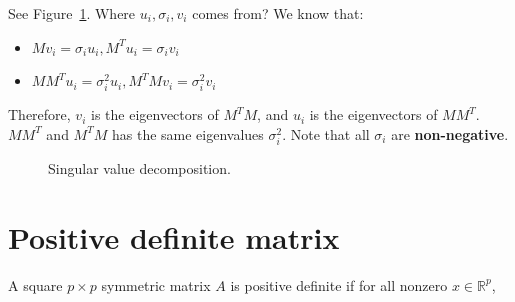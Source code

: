  See Figure~\ref{fig:svd_mar}. 
    Where $u_i, \sigma_i, v_i$ comes from? We know that:
    \begin{itemize}
        \item $Mv_i = \sigma_i u_i, M^T u_i = \sigma_i v_i$
        \item $M M^T u_i = \sigma_i^2 u_i, M^T M v_i = \sigma_i^2 v_i$
    \end{itemize}
    Therefore, $v_i$ is the eigenvectors of $M^T M$, and $u_i$ is the eigenvectors
    of $M M^T$. $MM^T$ and $M^TM$ has the same eigenvalues $\sigma_i^2$.  Note
    that all $\sigma_i$ are \textbf{non-negative}.

\begin{figure}[H]
	\caption{Singular value decomposition.}
	\label{fig:svd_mar}
\end{figure}

\section{Positive definite matrix }
\vspace{0.5cm}
\begin{definition}
    A square $p \times p$ symmetric matrix $A$ is positive definite if for all
    nonzero $x \in \mathbb{R}^p$,
\end{definition}

